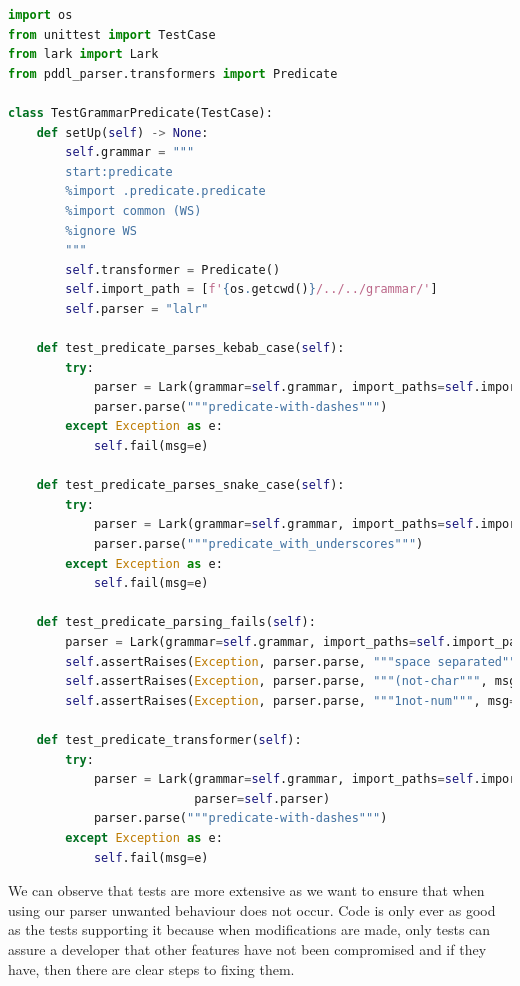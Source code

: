 \newpage
\begin{lstlisting}[language=Python]
import os
from unittest import TestCase
from lark import Lark
from pddl_parser.transformers import Predicate

class TestGrammarPredicate(TestCase):
    def setUp(self) -> None:
        self.grammar = """
        start:predicate
        %import .predicate.predicate
        %import common (WS)
        %ignore WS
        """
        self.transformer = Predicate()
        self.import_path = [f'{os.getcwd()}/../../grammar/']
        self.parser = "lalr"

    def test_predicate_parses_kebab_case(self):
        try:
            parser = Lark(grammar=self.grammar, import_paths=self.import_path, parser=self.parser)
            parser.parse("""predicate-with-dashes""")
        except Exception as e:
            self.fail(msg=e)

    def test_predicate_parses_snake_case(self):
        try:
            parser = Lark(grammar=self.grammar, import_paths=self.import_path, parser=self.parser)
            parser.parse("""predicate_with_underscores""")
        except Exception as e:
            self.fail(msg=e)

    def test_predicate_parsing_fails(self):
        parser = Lark(grammar=self.grammar, import_paths=self.import_path, parser=self.parser)
        self.assertRaises(Exception, parser.parse, """space separated""", msg='failed to raise on space separator')
        self.assertRaises(Exception, parser.parse, """(not-char""", msg='failed to raise on non char in word')
        self.assertRaises(Exception, parser.parse, """1not-num""", msg='failed to raise on num in word')

    def test_predicate_transformer(self):
        try:
            parser = Lark(grammar=self.grammar, import_paths=self.import_path, transformer=self.transformer,
                          parser=self.parser)
            parser.parse("""predicate-with-dashes""")
        except Exception as e:
            self.fail(msg=e)
\end{lstlisting}
We can observe that tests are more extensive as we want to ensure that when using our parser unwanted behaviour does not occur.
Code is only ever as good as the tests supporting it because when modifications are made, only tests can assure a developer that other features have not been compromised and if they have, then there are clear steps to fixing them.

